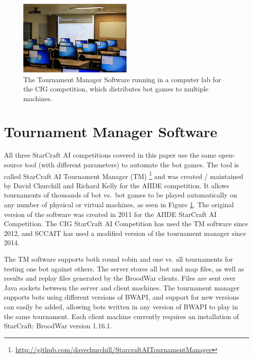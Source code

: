 \begin{figure}[t]
  \centering
  \includegraphics[width=0.5\textwidth]{fig/cig-starcraft-runs.png}
  \caption{The Tournament Manager Software running in a computer lab for the CIG competition, which distributes bot games to multiple machines.}
  \label{figCIGruns}
\end{figure}

\section{Tournament Manager Software}\label{secTournamentManagerSoftware}

All three StarCraft AI competitions covered in this paper use the same open-source tool (with different parameters) to automate the bot games. The tool is called StarCraft AI Tournament Manager (TM) \footnote{\url{http://github.com/davechurchill/StarcraftAITournamentManager}} and was created / maintained by David Churchill and Richard Kelly for the AIIDE competition. It allows tournaments of thousands of bot vs.\ bot games to be played automatically on any number of physical or virtual machines, as seen in Figure \ref{figCIGruns}. The original version of the software was created in 2011 for the AIIDE StarCraft AI Competition. The CIG StarCraft AI Competition has used the TM software since 2012, and SCCAIT has used a modified version of the tournament manager since 2014. 

The TM software supports both round robin and one vs. all tournaments for testing one bot against others. The server stores all bot and map files, as well as results and replay files generated by the BroodWar clients. Files are sent over Java sockets between the server and client machines. The tournament manager supports bots using different versions of BWAPI, and support for new versions can easily be added, allowing bots written in any version of BWAPI to play in the same tournament. Each client machine currently requires an installation of StarCraft: BroodWar version 1.16.1.

